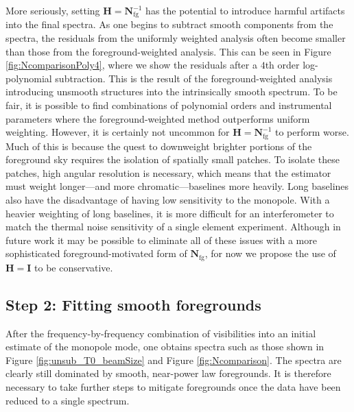 \documentclass[twocolumn,apj,numberedappendix]{emulateapj}
\newcommand{\Hmat}{\mathbf{H}}
\newcommand{\Nfg}{\mathbf{N}_{\textrm{fg}}}
\newcommand{\acl}[1]{}
\begin{document}
\acl{Modified this paragraph to soften some claims} More seriously, setting $\Hmat = \Nfg^{-1}$ has the potential to introduce harmful artifacts into the final spectra. As one begins to subtract smooth components from the spectra, the residuals from the uniformly weighted analysis often become smaller than those from the foreground-weighted analysis. This can be seen in Figure \ref{fig:NcomparisonPoly4}, where we show the residuals after a $4$th order log-polynomial subtraction. This is the result of the foreground-weighted analysis introducing unsmooth structures into the intrinsically smooth spectrum. To be fair, it is possible to find combinations of polynomial orders and instrumental parameters where the foreground-weighted method outperforms uniform weighting. However, it is certainly not uncommon for $\Hmat = \Nfg^{-1}$ to perform worse. Much of this is because the quest to downweight brighter portions of the foreground sky requires the isolation of spatially small patches. To isolate these patches, high angular resolution is necessary, which means that the estimator must weight longer---and more chromatic---baselines more heavily. Long baselines also have the disadvantage of having low sensitivity to the monopole. With a heavier weighting of long baselines, it is more difficult for an interferometer to match the thermal noise sensitivity of a single element experiment. Although in future work it may be possible to eliminate all of these issues with a more sophisticated foreground-motivated form of $\Nfg$, for now we propose the use of $\Hmat = \mathbf{I}$ to be conservative.

\subsection{Step 2: Fitting smooth foregrounds}
\label{sec:fitting}
After the frequency-by-frequency combination of visibilities into an initial estimate of the monopole mode, one obtains spectra such as those shown in Figure \ref{fig:unsub_T0_beamSize} and Figure \ref{fig:Ncomparison}. The spectra are clearly still dominated by smooth, near-power law foregrounds. It is therefore necessary to take further steps to mitigate foregrounds once the data have been reduced to a single spectrum.
\end{document}
